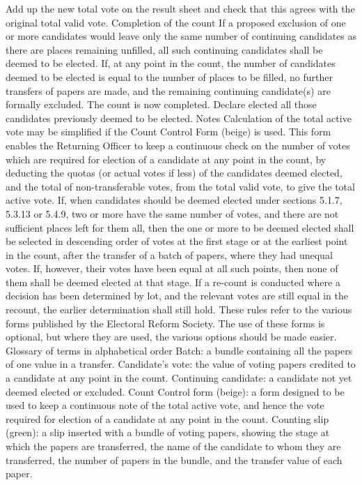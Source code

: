 Add up the new total vote on the result sheet and check that this agrees with the original total valid vote.
Completion of the count
If a proposed exclusion of one or more candidates would leave only the same number of continuing candidates as there are places remaining unfilled, all such continuing candidates shall be deemed to be elected.
If, at any point in the count, the number of candidates deemed to be elected is equal to the number of places to be filled, no further transfers of papers are made, and the remaining continuing candidate(s) are formally excluded.
The count is now completed.
Declare elected all those candidates previously deemed to be elected.
Notes
Calculation of the total active vote may be simplified if the Count Control Form (beige) is used. This form enables the Returning Officer to keep a continuous check on the number of votes which are required for election of a candidate at any point in the count, by deducting the quotas (or actual votes if less) of the candidates deemed elected, and the total of non-transferable votes, from the total valid vote, to give the total active vote.
If, when candidates should be deemed elected under sections 5.1.7, 5.3.13 or 5.4.9, two or more have the same number of votes, and there are not sufficient places left for them all, then the one or more to be deemed elected shall be selected in descending order of votes at the first stage or at the earliest point in the count, after the transfer of a batch of papers, where they had unequal votes. If, however, their votes have been equal at all such points, then none of them shall be deemed elected at that stage.
If a re-count is conducted where a decision has been determined by lot, and the relevant votes are still equal in the recount, the earlier determination shall still hold.
These rules refer to the various forms published by the Electoral Reform Society. The use of these forms is optional, but where they are used, the various options should be made easier.
Glossary of terms in alphabetical order
Batch: a bundle containing all the papers of one value in a transfer.
Candidate's vote: the value of voting papers credited to a candidate at any point in the count.
Continuing candidate: a candidate not yet deemed elected or excluded.
Count Control form (beige): a form designed to be used to keep a continuous note of the total active vote, and hence the vote required for election of a candidate at any point in the count.
Counting slip (green): a slip inserted with a bundle of voting papers, showing the stage at which the papers are transferred, the name of the candidate to whom they are transferred, the number of papers in the bundle, and the transfer value of each paper.

